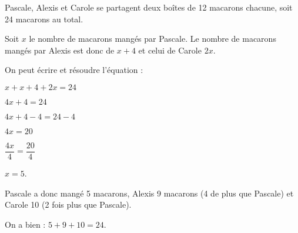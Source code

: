
\medskip

Pascale, Alexis et Carole se partagent deux boîtes de 12 macarons chacune, soit 24
macarons au total.

Soit $x$ le nombre de macarons mangés par Pascale. Le nombre de macarons mangés par
Alexis est donc de $x + 4$ et celui de Carole $2x$.

On peut écrire et résoudre l'équation :

$x + x + 4 + 2x = 24$

$4x + 4 = 24$

$4 x + 4 - 4 = 24 - 4$

$4x = 20$

$\dfrac{4x}{4} = \dfrac{20}{4}$

$x = 5$.

Pascale a donc mangé 5 macarons, Alexis 9 macarons (4 de plus que Pascale) et Carole
10 (2 fois plus que Pascale).

On a bien : $5 + 9 + 10=24$.
\vspace{0,5cm}

